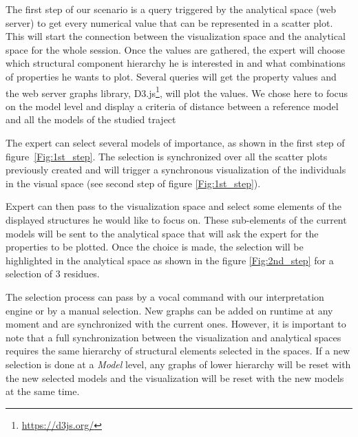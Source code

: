 \documentclass{vgtc}                          %
\begin{document}
The first step of our scenario is a query triggered by the analytical space (web server) to get every numerical value that can be represented in a scatter plot. This will start the connection between the visualization space and the analytical space for the whole session. 
Once the values are gathered, the expert will choose which structural component hierarchy he is interested in and what combinations of properties he wants to plot. Several queries will get the property values and the web server graphs library, D3.js\footnote{\url{https://d3js.org/}}, will plot the values. We chose here to focus on the model level and display a criteria of distance between a reference model and all the models of the studied traject

The expert can select several models of importance, as shown in the first step of figure~\ref{Fig:1st_step}. The selection is synchronized over all the scatter plots previously created and will trigger a synchronous visualization of the individuals in the visual space (see second step of figure \ref{Fig:1st_step}).

Expert can then pass to the visualization space and select some elements of the displayed structures he would like to focus on. These sub-elements of the current models will be sent to the analytical space that will ask the expert for the properties to be plotted. Once the choice is made, the selection will be highlighted in the analytical space as shown in the figure \ref{Fig:2nd_step} for a selection of 3 residues.

The selection process can pass by a vocal command with our interpretation engine or by a manual selection. 
New graphs can be added on runtime at any moment and are synchronized with the current ones. However, it is important to note that a full synchronization between the visualization and analytical spaces requires the same hierarchy of structural elements selected in the spaces. If a new selection is done at a \textit{Model} level, any graphs of lower hierarchy will be reset with the new selected models and the visualization will be reset with the new models at the same time.
\end{document}
